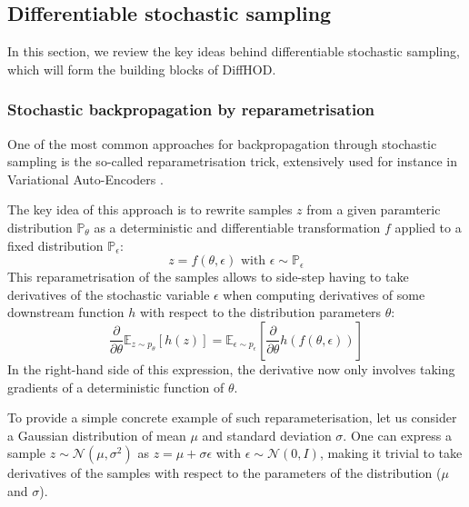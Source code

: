 \documentclass[a4paper,usenatbib]{mnras}
\begin{document}
\subsection{Differentiable stochastic sampling}

In this section, we review the key ideas behind differentiable stochastic sampling, which will form the building blocks of DiffHOD.

\subsubsection{Stochastic backpropagation by reparametrisation}

One of the most common approaches for backpropagation through stochastic sampling is the so-called reparametrisation trick, extensively used for instance in Variational Auto-Encoders \citep{Kingma2013,Rezende2014}. 

The key idea of this approach is to rewrite samples $z$ from a given paramteric distribution $\mathbb{P}_{\theta}$ as a deterministic and differentiable transformation $f$ applied to a fixed distribution $\mathbb{P}_{\epsilon}$:
\begin{equation}
    z = f(\theta, \epsilon) \mbox{ with } \epsilon \sim \mathbb{P}_{\epsilon} 
\end{equation}
This reparametrisation of the samples allows to side-step having to take derivatives of the stochastic variable $\epsilon$ when computing derivatives of some downstream function $h$ with respect to the distribution parameters $\theta$:
\begin{equation}
    \frac{\partial}{\partial \theta} \mathbb{E}_{z \sim p_\theta}\left[ h(z) \right] = 
    \mathbb{E}_{\epsilon \sim p_\epsilon} \left[ \frac{\partial}{\partial \theta} h(f(\theta, \epsilon)) \right] %
\end{equation}
In the right-hand side of this expression, the derivative now only involves taking gradients of a deterministic function of $\theta$. 

To provide a simple concrete example of such reparameterisation, let us consider a Gaussian distribution of mean $\mu$ and standard deviation $\sigma$. One can express a sample $z \sim \mathcal{N}(\mu, \sigma^2)$ as $z = \mu + \sigma \epsilon$ with $\epsilon \sim \mathcal{N}(0, I)$, making it trivial to take derivatives of the samples with respect to the parameters of the distribution ($\mu$ and $\sigma$).
\end{document}
